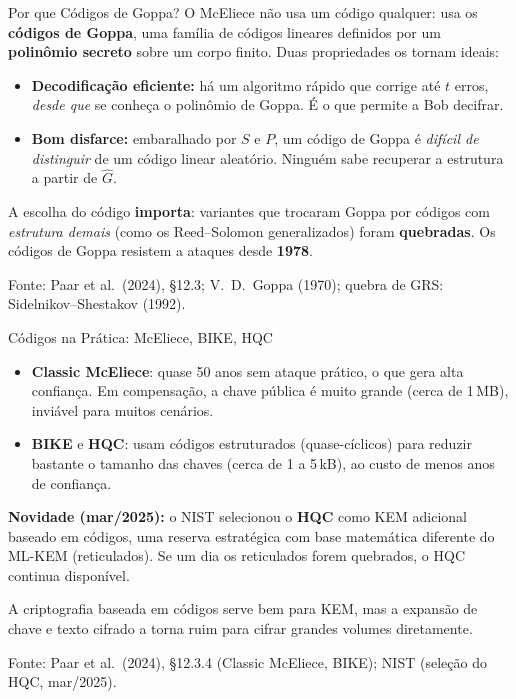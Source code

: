 \documentclass{beamer}
\begin{document}
\begin{frame}{Por que Códigos de Goppa?}
    \footnotesize
    O McEliece não usa um código qualquer: usa os \textbf{códigos de Goppa}, uma família de códigos lineares definidos por um \textbf{polinômio secreto} sobre um corpo finito. Duas propriedades os tornam ideais:
    \medskip
    \begin{itemize}
        \item \textbf{Decodificação eficiente:} há um algoritmo rápido que corrige até $t$ erros, \emph{desde que} se conheça o polinômio de Goppa. É o que permite a Bob decifrar.
        \item \textbf{Bom disfarce:} embaralhado por $S$ e $P$, um código de Goppa é \emph{difícil de distinguir} de um código linear aleatório. Ninguém sabe recuperar a estrutura a partir de $\hat{G}$.
    \end{itemize}
    \medskip
    \begin{tcolorbox}[colback=red!5,colframe=red!60!black,boxrule=0.5pt]
        \footnotesize
        A escolha do código \textbf{importa}: variantes que trocaram Goppa por códigos com \emph{estrutura demais} (como os Reed--Solomon generalizados) foram \textbf{quebradas}. Os códigos de Goppa resistem a ataques desde \textbf{1978}.
    \end{tcolorbox}
    \smallskip
    {\tiny Fonte: Paar et al.\ (2024), §12.3; V.\ D.\ Goppa (1970); quebra de GRS: Sidelnikov--Shestakov (1992).}
\end{frame}

\begin{frame}{Códigos na Prática: McEliece, BIKE, HQC}
    \begin{itemize}
        \footnotesize
        \item \textbf{Classic McEliece}: quase 50 anos sem ataque prático, o que gera alta confiança. Em compensação, a chave pública é muito grande (cerca de 1\,MB), inviável para muitos cenários.
        \item \textbf{BIKE} e \textbf{HQC}: usam códigos estruturados (quase-cíclicos) para reduzir bastante o tamanho das chaves (cerca de 1 a 5\,kB), ao custo de menos anos de confiança.
    \end{itemize}
    \medskip
    \begin{tcolorbox}[colback=green!6,colframe=green!50!black,boxrule=0.5pt]
        \footnotesize
        \textbf{Novidade (mar/2025):} o NIST selecionou o \textbf{HQC} como KEM adicional baseado em códigos, uma reserva estratégica com base matemática diferente do ML-KEM (reticulados). Se um dia os reticulados forem quebrados, o HQC continua disponível.
    \end{tcolorbox}
    \medskip
    \begin{tcolorbox}[colback=blue!5,colframe=blue!50!black,boxrule=0.5pt]
        \footnotesize
        A criptografia baseada em códigos serve bem para KEM, mas a expansão de chave e texto cifrado a torna ruim para cifrar grandes volumes diretamente.
    \end{tcolorbox}
    \smallskip
    {\tiny Fonte: Paar et al.\ (2024), §12.3.4 (Classic McEliece, BIKE); NIST (seleção do HQC, mar/2025).}
\end{frame}
\end{document}
